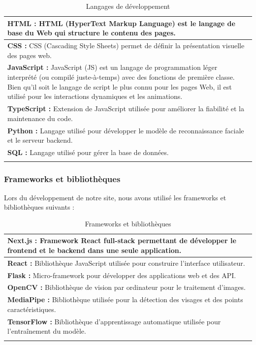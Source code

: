 \renewcommand{\arraystretch}{1.4}
\setlength{\LTleft}{\fill}
\setlength{\LTright}{\fill}
\begin{center}
\begin{longtable}{|m{14cm}|}
\hline
\textbf{HTML :} HTML (HyperText Markup Language) est le langage de base du Web qui
structure le contenu des pages.\cite{HTML} \\ \hline
\textbf{CSS :} CSS (Cascading Style Sheets) permet de définir la présentation visuelle
des pages web.\cite{CSS} \\ \hline
\textbf{JavaScript :} JavaScript (JS) est un langage de programmation léger interprété
(ou compilé juste-à-temps) avec des fonctions de première classe. Bien qu'il soit le
langage de script le plus connu pour les pages Web, il est utilisé pour les interactions
dynamiques et les animations.\cite{JavaScript} \\ \hline
\textbf{TypeScript :} Extension de JavaScript utilisée pour améliorer la fiabilité et
la maintenance du code.\cite{TypeScript} \\ \hline
\textbf{Python :} Langage utilisé pour développer le modèle de reconnaissance faciale
et le serveur backend.\cite{Python} \\ \hline
\textbf{SQL :} Langage utilisé pour gérer la base de données.\cite{SQL} \\ \hline
\caption{Langages de développement}
\end{longtable}
\end{center}

\subsubsection{Frameworks et bibliothèques}

Lors du développement de notre site, nous avons utilisé les frameworks et bibliothèques
suivants :

\begin{center}
\begin{longtable}{|m{14cm}|}
\hline
\textbf{Next.js :} Framework React full-stack permettant de développer le frontend et
le backend dans une seule application.\cite{Next.js} \\ \hline
\textbf{React :} Bibliothèque JavaScript utilisée pour construire l'interface
utilisateur.\cite{React} \\ \hline
\textbf{Flask :} Micro-framework pour développer des applications web et des
API.\cite{Flask} \\ \hline
\textbf{OpenCV :} Bibliothèque de vision par ordinateur pour le traitement
d'images.\cite{OpenCV} \\ \hline
\textbf{MediaPipe :} Bibliothèque utilisée pour la détection des visages et des points
caractéristiques.\cite{MediaPipe} \\ \hline
\textbf{TensorFlow :} Bibliothèque d'apprentissage automatique utilisée pour
l'entraînement du modèle.\cite{TensorFlow} \\ \hline
\caption{Frameworks et bibliothèques}
\end{longtable}
\end{center}

